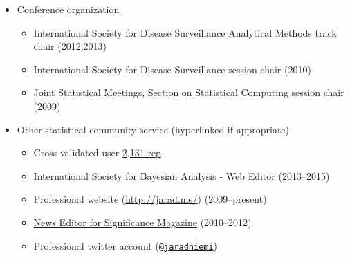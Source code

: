 \documentclass[overlapped,line]{res}
\begin{document}
\begin{resume}
\begin{itemize}
\item Conference organization
 \begin{itemize}
 \item International Society for Disease Surveillance Analytical Methods track chair (2012,2013)
 \item International Society for Disease Surveillance session chair (2010)
 \item Joint Statistical Meetings, Section on Statistical Computing session chair (2009)
 \end{itemize}
\item Other statistical community service (hyperlinked if appropriate)
 \begin{itemize}
 \item Cross-validated user \href{http://stats.stackexchange.com/users/40440/jaradniemi}{2,131 rep}
 \item \href{http://bayesian.org/}{International Society for Bayesian Analysis -  Web Editor} (2013--2015)
 \item Professional website (\url{http://jarad.me/}) (2009--present)
 \item \href{http://www.significancemagazine.org/view/searchResults.html?s=&t=&q=jarad+niemi}{News Editor for Significance Magazine} (2010--2012)
 \item Professional twitter account ({\tt \href{https://twitter.com/jaradniemi}{@jaradniemi}})
 \end{itemize}


\end{itemize}
\end{resume}
\end{document}
